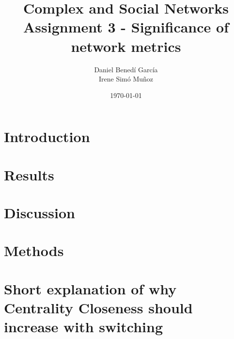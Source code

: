 \documentclass{article}
\title{Complex and Social Networks \\ Assignment 3 - Significance of network metrics}
\author{Daniel Benedí García\\ Irene Simó Muñoz}
\date{\monthyeardate\today}
\begin{document}
\maketitle
\begin{multicols}{2}
\tableofcontents
\end{multicols}

\section{Introduction}
\label{sec:introduction}


\section{Results}
\label{sec:results}


\section{Discussion}
\label{sec:discussion}


\section{Methods}
\label{sec:methods}


\printbibliography

\newpage
\appendix
\section{Short explanation of why Centrality Closeness should increase
with switching}
\label{appendix:cc}

\end{document}
